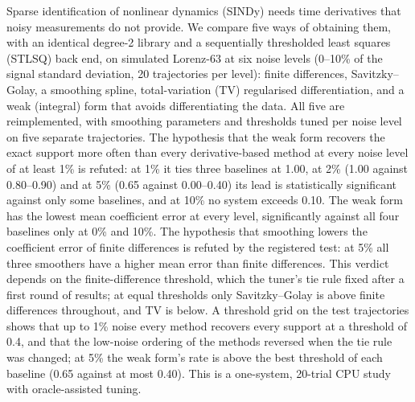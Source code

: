 Sparse identification of nonlinear dynamics (SINDy) needs time derivatives that noisy measurements do not provide. We compare five ways of obtaining them, with an identical degree-2 library and a sequentially thresholded least squares (STLSQ) back end, on simulated Lorenz-63 at six noise levels (0--10\% of the signal standard deviation, 20 trajectories per level): finite differences, Savitzky--Golay, a smoothing spline, total-variation (TV) regularised differentiation, and a weak (integral) form that avoids differentiating the data. All five are reimplemented, with smoothing parameters and thresholds tuned per noise level on five separate trajectories. The hypothesis that the weak form recovers the exact support more often than every derivative-based method at every noise level of at least 1\% is refuted: at 1\% it ties three baselines at 1.00, at 2\% (1.00 against 0.80--0.90) and at 5\% (0.65 against 0.00--0.40) its lead is statistically significant against only some baselines, and at 10\% no system exceeds 0.10. The weak form has the lowest mean coefficient error at every level, significantly against all four baselines only at 0\% and 10\%. The hypothesis that smoothing lowers the coefficient error of finite differences is refuted by the registered test: at 5\% all three smoothers have a higher mean error than finite differences. This verdict depends on the finite-difference threshold, which the tuner's tie rule fixed after a first round of results; at equal thresholds only Savitzky--Golay is above finite differences throughout, and TV is below. A threshold grid on the test trajectories shows that up to 1\% noise every method recovers every support at a threshold of 0.4, and that the low-noise ordering of the methods reversed when the tie rule was changed; at 5\% the weak form's rate is above the best threshold of each baseline (0.65 against at most 0.40). This is a one-system, 20-trial CPU study with oracle-assisted tuning.
